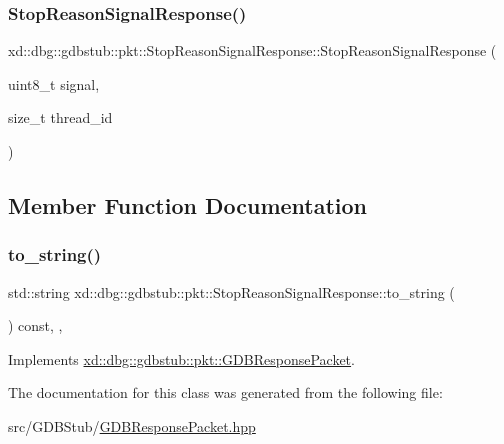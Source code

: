 \subsubsection{\texorpdfstring{Stop\+Reason\+Signal\+Response()}{StopReasonSignalResponse()}}
{\footnotesize\ttfamily xd\+::dbg\+::gdbstub\+::pkt\+::\+Stop\+Reason\+Signal\+Response\+::\+Stop\+Reason\+Signal\+Response (\begin{DoxyParamCaption}\item[{uint8\+\_\+t}]{signal,  }\item[{size\+\_\+t}]{thread\+\_\+id }\end{DoxyParamCaption})\hspace{0.3cm}{\ttfamily [inline]}}



\subsection{Member Function Documentation}
\mbox{\label{classxd_1_1dbg_1_1gdbstub_1_1pkt_1_1_stop_reason_signal_response_a5aa0a7ea7ee15f287165fae5f29c84e8}} 
\subsubsection{\texorpdfstring{to\+\_\+string()}{to\_string()}}
{\footnotesize\ttfamily std\+::string xd\+::dbg\+::gdbstub\+::pkt\+::\+Stop\+Reason\+Signal\+Response\+::to\+\_\+string (\begin{DoxyParamCaption}{ }\end{DoxyParamCaption}) const\hspace{0.3cm}{\ttfamily [inline]}, {\ttfamily [override]}, {\ttfamily [virtual]}}



Implements \mbox{\hyperlink{classxd_1_1dbg_1_1gdbstub_1_1pkt_1_1_g_d_b_response_packet_a2a15795536cd5ff94f0533c406233874}{xd\+::dbg\+::gdbstub\+::pkt\+::\+G\+D\+B\+Response\+Packet}}.



The documentation for this class was generated from the following file\+:\begin{DoxyCompactItemize}
\item 
src/\+G\+D\+B\+Stub/\mbox{\hyperlink{_g_d_b_response_packet_8hpp}{G\+D\+B\+Response\+Packet.\+hpp}}\end{DoxyCompactItemize}
